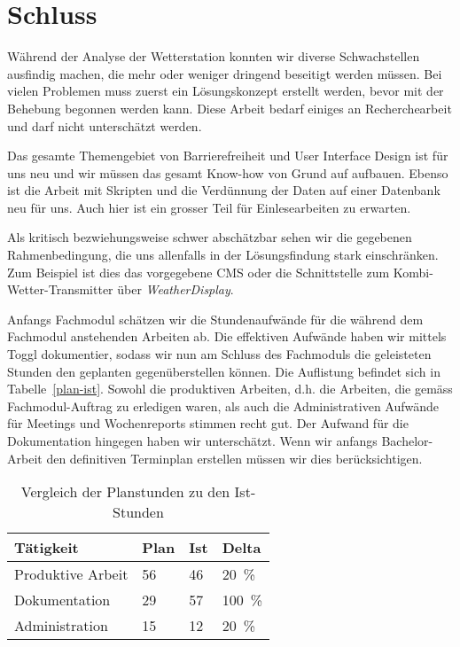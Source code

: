 \section{Schluss}
Während der Analyse der Wetterstation konnten wir diverse Schwachstellen ausfindig machen, die mehr oder weniger dringend beseitigt werden müssen.
Bei vielen Problemen muss zuerst ein Lösungskonzept erstellt werden, bevor mit der Behebung begonnen werden kann. Diese Arbeit bedarf einiges an Recherchearbeit und darf nicht unterschätzt werden.
\newline

\noindent
Das gesamte Themengebiet von Barrierefreiheit und User Interface Design ist für uns neu und wir müssen das gesamt Know-how von Grund auf aufbauen. Ebenso ist die Arbeit mit Skripten und die Verdünnung der Daten auf einer Datenbank neu für uns. Auch hier ist ein grosser Teil für Einlesearbeiten zu erwarten.
\newline

\noindent
Als kritisch bezwiehungsweise schwer abschätzbar sehen wir die gegebenen Rahmenbedingung, die uns allenfalls in der Lösungsfindung stark einschränken.
Zum Beispiel ist dies das vorgegebene CMS oder die Schnittstelle zum Kombi-Wetter-Transmitter über \textit{WeatherDisplay}.
\newline

\noindent
Anfangs Fachmodul schätzen wir die Stundenaufwände für die während dem Fachmodul anstehenden Arbeiten ab. Die effektiven Aufwände haben wir mittels Toggl dokumentier, sodass wir nun am Schluss des Fachmoduls die geleisteten Stunden den geplanten gegenüberstellen können. Die Auflistung befindet sich in Tabelle~\ref{plan-ist}. 
Sowohl die produktiven Arbeiten, d.h. die Arbeiten, die gemäss Fachmodul-Auftrag zu erledigen waren, als auch die Administrativen Aufwände für Meetings und Wochenreports stimmen recht gut. Der Aufwand für die Dokumentation hingegen haben wir unterschätzt. Wenn wir anfangs Bachelor-Arbeit den definitiven Terminplan erstellen müssen wir dies berücksichtigen.
\newline

\begin{table}[h]
\centering
\begin{tabular}{|l|l|l|l|}
\hline
 Tätigkeit			&  Plan	& Ist  	& Delta  		\\ \hline
 Produktive Arbeit	&  56		&  46		&  20~\%		\\ \hline
 Dokumentation		&  29		&  57		&  100~\%		\\ \hline
 Administration		&  15		&  12		&  20~\%		\\ \hline
\end{tabular}
\caption{Vergleich der Planstunden zu den Ist-Stunden}
\label{table:plan-ist}
\end{table}

